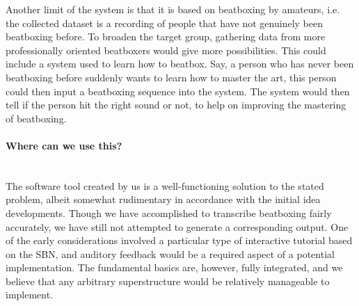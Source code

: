 Another limit of the system is that it is based on beatboxing by amateurs, i.e. the collected dataset is a recording of people that have not genuinely been beatboxing before. To broaden the target group, gathering data from more professionally oriented beatboxers would give more possibilities. This could include a system used to learn how to beatbox. Say, a person who has never been beatboxing before suddenly wants to learn how to master the art, this person could then input a beatboxing sequence into the system. The system would then tell if the person hit the right sound or not, to help on improving the mastering of beatboxing.


\paragraph{Where can we use this?} \hspace{0pt} \\
The software tool created by us is a well-functioning solution to the stated problem, albeit somewhat rudimentary in accordance with the initial idea developments. Though we have accomplished to transcribe beatboxing fairly accurately, we have still not attempted to generate a corresponding output. One of the early considerations involved a particular type of interactive tutorial based on the SBN, and auditory feedback would be a required aspect of a potential implementation. The fundamental basics are, however, fully integrated, and we believe that any arbitrary superstructure would be relatively manageable to implement.
